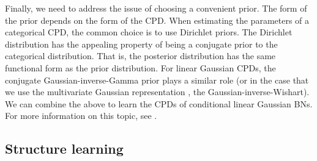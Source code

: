 %
%

Finally, we need to address the issue of choosing a convenient prior. The form of the prior depends on the form of the CPD. When estimating the parameters of a categorical CPD, the common choice is to use Dirichlet priors. The Dirichlet distribution has the appealing property of being a conjugate prior to the categorical distribution. That is, the posterior distribution has the same functional form as the prior distribution. For linear Gaussian CPDs, the conjugate Gaussian-inverse-Gamma prior plays a similar role (or in the case that we use the multivariate Gaussian representation \citep{geiger1994_bge}, the Gaussian-inverse-Wishart). We can combine the above to learn the CPDs of conditional linear Gaussian BNs. For more information on this topic, see \cite{bishop2006}.


\subsection{Structure learning} \label{sec:2_structure_learning}

